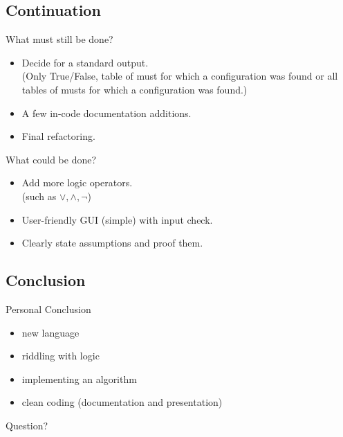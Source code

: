 \documentclass{beamer}
\begin{document}
\subsection{Continuation}
\begin{frame}{What must still be done?}
\begin{itemize}
	\item Decide for a standard output. \\
	(Only True/False, table of must for which a configuration was found or all tables of musts for which a configuration was found.)
	\item A few in-code documentation additions.
	\item Final refactoring.
\end{itemize}
\end{frame}

\begin{frame}{What could be done?}
\begin{itemize}
	\item Add more logic operators. \\
	(such as $\vee, \wedge, ¬$)
	\item User-friendly GUI (simple) with input check.
	\item Clearly state assumptions and proof them.
\end{itemize}
\end{frame}

\subsection{Conclusion}
\begin{frame}{Personal Conclusion}
	\begin{center}
	\begin{itemize}
		\item new language
		\item riddling with logic
		\item implementing an algorithm
		\item clean coding (documentation and presentation)
	\end{itemize}
	\end{center}
\end{frame}

\begin{frame}{Question?}

\end{frame}
\end{document}
